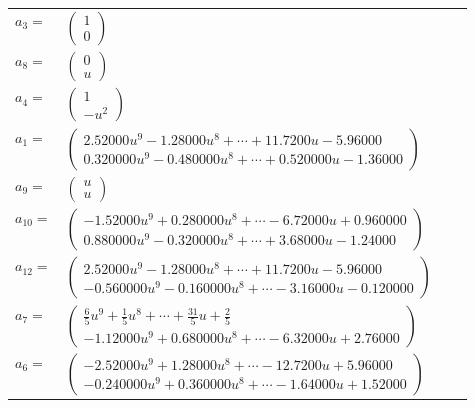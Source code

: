 \documentclass[1p]{elsarticle_modified}
\theoremstyle{definition}
\begin{document}
\begin{tabular}{m{7pt} m{180pt} m{7pt} m{180pt} }
\flushright $a_{3}=$&$\begin{pmatrix}1\\0\end{pmatrix}$ \\
\flushright $a_{8}=$&$\begin{pmatrix}0\\u\end{pmatrix}$ \\
\flushright $a_{4}=$&$\begin{pmatrix}1\\- u^2\end{pmatrix}$ \\
\flushright $a_{1}=$&$\begin{pmatrix}2.52000 u^{9}-1.28000 u^{8}+\cdots+11.7200 u-5.96000\\0.320000 u^{9}-0.480000 u^{8}+\cdots+0.520000 u-1.36000\end{pmatrix}$ \\
\flushright $a_{9}=$&$\begin{pmatrix}u\\u\end{pmatrix}$ \\
\flushright $a_{10}=$&$\begin{pmatrix}-1.52000 u^{9}+0.280000 u^{8}+\cdots-6.72000 u+0.960000\\0.880000 u^{9}-0.320000 u^{8}+\cdots+3.68000 u-1.24000\end{pmatrix}$ \\
\flushright $a_{12}=$&$\begin{pmatrix}2.52000 u^{9}-1.28000 u^{8}+\cdots+11.7200 u-5.96000\\-0.560000 u^{9}-0.160000 u^{8}+\cdots-3.16000 u-0.120000\end{pmatrix}$ \\
\flushright $a_{7}=$&$\begin{pmatrix}\frac{6}{5} u^9+\frac{1}{5} u^8+\cdots+\frac{31}{5} u+\frac{2}{5}\\-1.12000 u^{9}+0.680000 u^{8}+\cdots-6.32000 u+2.76000\end{pmatrix}$ \\
\flushright $a_{6}=$&$\begin{pmatrix}-2.52000 u^{9}+1.28000 u^{8}+\cdots-12.7200 u+5.96000\\-0.240000 u^{9}+0.360000 u^{8}+\cdots-1.64000 u+1.52000\end{pmatrix}$ \\

\end{tabular}
\end{document}
